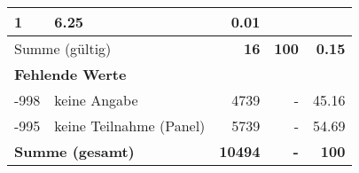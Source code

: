 \begin{longtable}{lXrrr}
       \num{1} &
       \num[round-mode=places,round-precision=2]{6.25} &
         \num[round-mode=places,round-precision=2]{0.01} \\
     \midrule
     \multicolumn{2}{l}{Summe (gültig)} &
       \textbf{\num{16}} &
     \textbf{\num{100}} &
       \textbf{\num[round-mode=places,round-precision=2]{0.15}} \\
     \multicolumn{5}{l}{\textbf{Fehlende Werte}}\\
       -998 &
       keine Angabe &
         \num{4739} &
        - &
         \num[round-mode=places,round-precision=2]{45.16} \\
       -995 &
       keine Teilnahme (Panel) &
         \num{5739} &
        - &
         \num[round-mode=places,round-precision=2]{54.69} \\
     \midrule
     \multicolumn{2}{l}{\textbf{Summe (gesamt)}} &
          \textbf{\num{10494}} &
        \textbf{-} &
        \textbf{\num{100}} \\
     \bottomrule
     \end{longtable}
     

